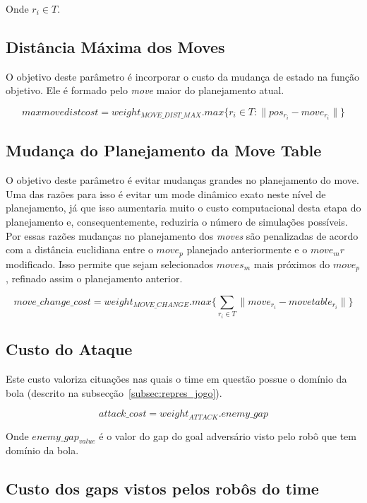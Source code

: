 Onde $r_i \in T$.

\subsection{Distância Máxima dos Moves} 
O objetivo deste parâmetro é incorporar o custo da
mudança de estado na função objetivo. Ele é formado pelo \textit{move}
maior do planejamento atual.

\begin{dmath} 
 max move dist cost = weight_{MOVE{\_}DIST{\_}MAX} . 
 max \lbrace r_i \in T : \lVert pos_{r_i} - move_{r_i}\rVert \rbrace
\end{dmath} 

\subsection{Mudança do Planejamento da Move Table}\label{subsec:change_cost}
O objetivo deste parâmetro é evitar mudanças grandes no
planejamento do move. Uma das razões para isso é evitar um mode dinâmico
exato neste nível de planejamento, já que isso aumentaria muito o custo
computacional desta etapa do planejamento e, consequentemente, reduziria
o número de simulações possíveis. Por essas razões mudanças no planejamento
dos \textit{moves} são penalizadas de acordo com a distância euclidiana
entre o $move_p$ planejado anteriormente e o $move_mr$ modificado.
Isso permite que sejam selecionados $moves_m$ mais próximos do
$move_p$, refinado assim o planejamento anterior.

\begin{dmath} 
 move{\_}change{\_}cost = weight_{MOVE{\_}CHANGE} . 
 max \lbrace \sum_{r_i \in T} \lVert move_{r_i} - move table_{r_i}\rVert \rbrace
\end{dmath} 

\subsection{Custo do Ataque}
Este custo valoriza cituações nas quais o time em questão
possue o domínio da bola (descrito na
subsecção~\ref{subsec:repres_jogo}).

\begin{dmath} 
 attack{\_}cost = weight_{ATTACK} . enemy{\_}gap
\end{dmath} 

Onde $enemy{\_}gap_{value}$ é o valor do gap do goal adversário visto
pelo robô que tem domínio da bola.

\subsection{Custo dos gaps vistos pelos robôs do time}

